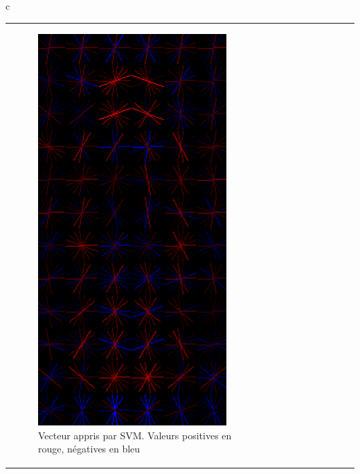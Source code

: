 \begin{table}
\begin{center}
\begin{tabular}  {c}
\begin{tabular} [t]{lcr}
\begin{subfigure}{0.2\textwidth}
						\includegraphics[width=0.9\textwidth]{Chapter2/graphics/hog_svm.png} 
						\captionsetup{justification=raggedright}
						\caption{Vecteur appris par SVM. Valeurs positives en rouge, négatives en bleu}
					\end{subfigure}	
					&
					\begin{subfigure}{0.2\textwidth}

\end{subfigure}
\end{tabular}
\end{tabular}
\end{center}
\end{table}

